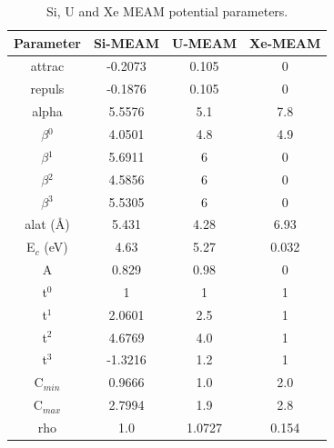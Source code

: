 \documentclass[review]{elsarticle}
\begin{document}
\begin{table}[h]
\caption{Si, U and Xe MEAM potential parameters. }\label{tab:lib}
\begin{center}
\begin{tabular}{|c|c|c|c|}
 \hline
 Parameter & Si-MEAM \cite{beelerusi} & U-MEAM \cite{moore2015} & Xe-MEAM \cite{beelerASTM} \\
 \hline
 attrac & -0.2073 & 0.105 & 0 \\
 repuls & -0.1876 & 0.105 & 0 \\
 alpha & 5.5576 & 5.1 & 7.8 \\
 $\beta$$^{0}$ & 4.0501 & 4.8 & 4.9 \\
 $\beta$$^{1}$ & 5.6911 & 6 & 0 \\
 $\beta$$^{2}$ & 4.5856 & 6 & 0 \\ 
 $\beta$$^{3}$ & 5.5305 & 6 & 0 \\
 alat (\AA) & 5.431 & 4.28 & 6.93 \\
 E$_{c}$ (eV) & 4.63 & 5.27 & 0.032 \\
 A & 0.829 & 0.98 & 0\\
 t$^{0}$ & 1 & 1 & 1 \\
 t$^{1}$ & 2.0601 & 2.5 & 1 \\
 t$^{2}$ & 4.6769 & 4.0 & 1\\
 t$^{3}$ & -1.3216 & 1.2 & 1 \\
 C$_{min}$ & 0.9666 & 1.0 & 2.0 \\ 
 C$_{max}$ & 2.7994 & 1.9 & 2.8 \\
 rho & 1.0 & 1.0727 & 0.154 \\
 \hline
\end{tabular}
\end{center}
\label{default}
\end{table}%
\end{document}
